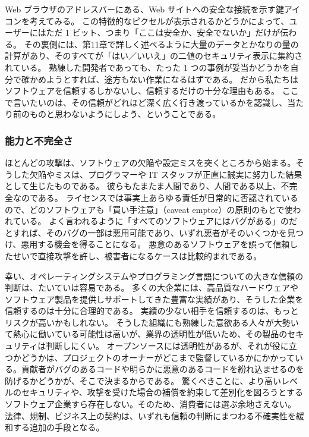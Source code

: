 \documentclass[uplatex]{jsarticle}
\def\label#1{}%
\begin{document}
\begin{exa}[ブラウザの鍵アイコン]\label{exa:ch1-lock-icon}
Web ブラウザのアドレスバーにある、Web サイトへの安全な接続を示す鍵アイコンを考えてみる。
この特徴的なピクセルが表示されるかどうかによって、ユーザーにはただ 1 ビット、つまり「ここは安全か、安全でないか」だけが伝わる。
その裏側には、第11章で詳しく述べるように大量のデータとかなりの量の計算があり、そのすべてが「はい／いいえ」の二値のセキュリティ表示に集約されている。
熟練した開発者であっても、たった 1 つの事例が妥当かどうかを自分で確かめようとすれば、途方もない作業になるはずである。
だから私たちはソフトウェアを信頼するしかないし、信頼するだけの十分な理由もある。
ここで言いたいのは、その信頼がどれほど深く広く行き渡っているかを認識し、当たり前のものと思わないようにしよう、ということである。
\end{exa}

\subsubsection{能力と不完全さ}

ほとんどの攻撃は、ソフトウェアの欠陥や設定ミスを突くところから始まる。そうした欠陥やミスは、プログラマーや IT スタッフが正直に誠実に努力した結果として生じたものである。
彼らもたまたま人間であり、人間である以上、不完全なのである。
ライセンスでは事実上あらゆる責任が日常的に否認されているので、どのソフトウェアも「買い手注意」（caveat emptor）の原則のもとで使われている。
よく言われるように「すべてのソフトウェアにはバグがある」のだとすれば、そのバグの一部は悪用可能であり、いずれ悪者がそのいくつかを見つけ、悪用する機会を得ることになる。
悪意のあるソフトウェアを誤って信頼したせいで直接攻撃を許し、被害者になるケースは比較的まれである。

幸い、オペレーティングシステムやプログラミング言語についての大きな信頼の判断は、たいていは容易である。
多くの大企業には、高品質なハードウェアやソフトウェア製品を提供しサポートしてきた豊富な実績があり、そうした企業を信頼するのは十分に合理的である。
実績の少ない相手を信頼するのは、もっとリスクが高いかもしれない。
そうした組織にも熟練した意欲ある人々が大勢いて熱心に働いている可能性は高いが、業界の透明性が低いため、その製品のセキュリティは判断しにくい。
オープンソースには透明性があるが、それが役に立つかどうかは、プロジェクトのオーナーがどこまで監督しているかにかかっている。貢献者がバグのあるコードや明らかに悪意のあるコードを紛れ込ませるのを防げるかどうかが、そこで決まるからである。
驚くべきことに、より高いレベルのセキュリティや、攻撃を受けた場合の補償を約束して差別化を図ろうとするソフトウェア企業すら存在しない。そのため、消費者には選ぶ余地さえない。
法律、規制、ビジネス上の契約は、いずれも信頼の判断にまつわる不確実性を緩和する追加の手段となる。
\end{document}
